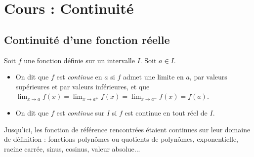 \documentclass[11pt,fleqn, openany]{book} %
\begin{document}



\chapter{Cours : Continuité}



\section{Continuité d'une fonction réelle}

\begin{definition}[Continuité] Soit $f$ une fonction définie sur un intervalle $I$. Soit $a\in I$.
\begin{itemize}
\item On dit que $f$ est \textit{continue} en $a$ si $f$ admet une limite en $a$, par valeurs supérieures et par valeurs inférieures, et que  $\displaystyle \lim_{x \to a} f(x)=\displaystyle \lim_{x \to a^+} f(x)=\displaystyle \lim_{x \to a^-} f(x)=f(a)$.
\item On dit que $f$ est \textit{continue} sur $I$ si $f$ est continue en tout réel de $I$.
\end{itemize}\end{definition}

\begin{example} Jusqu'ici, les fonction de référence rencontrées étaient continues sur leur domaine de définition : fonctions polynômes ou quotients de polynômes, exponentielle, racine carrée, sinus, cosinus, valeur absolue...\end{example}
\end{document}
